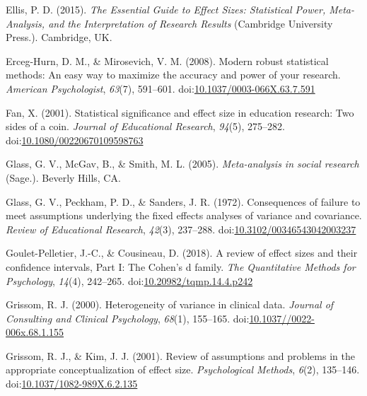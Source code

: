 \documentclass[
  man,floatsintext]{apa6}
\begin{document}
\leavevmode\hypertarget{ref-Ellis_2015}{}%
Ellis, P. D. (2015). \emph{The Essential Guide to Effect Sizes: Statistical Power, Meta-Analysis, and the Interpretation of Research Results} (Cambridge University Press.). Cambridge, UK.

\leavevmode\hypertarget{ref-Erceg-Hurn_Mirosevich_2008}{}%
Erceg-Hurn, D. M., \& Mirosevich, V. M. (2008). Modern robust statistical methods: An easy way to maximize the accuracy and power of your research. \emph{American Psychologist}, \emph{63}(7), 591--601. doi:\href{https://doi.org/10.1037/0003-066X.63.7.591}{10.1037/0003-066X.63.7.591}

\leavevmode\hypertarget{ref-Fan_2001}{}%
Fan, X. (2001). Statistical significance and effect size in education research: Two sides of a coin. \emph{Journal of Educational Research}, \emph{94}(5), 275--282. doi:\href{https://doi.org/10.1080/00220670109598763}{10.1080/00220670109598763}

\leavevmode\hypertarget{ref-Glass_et_al_1981}{}%
Glass, G. V., McGav, B., \& Smith, M. L. (2005). \emph{Meta-analysis in social research} (Sage.). Beverly Hills, CA.

\leavevmode\hypertarget{ref-Glass_et_al_1972}{}%
Glass, G. V., Peckham, P. D., \& Sanders, J. R. (1972). Consequences of failure to meet assumptions underlying the fixed effects analyses of variance and covariance. \emph{Review of Educational Research}, \emph{42}(3), 237--288. doi:\href{https://doi.org/10.3102/00346543042003237}{10.3102/00346543042003237}

\leavevmode\hypertarget{ref-Pelletier_Cousineau_2018}{}%
Goulet-Pelletier, J.-C., \& Cousineau, D. (2018). A review of effect sizes and their confidence intervals, Part I: The Cohen's d family. \emph{The Quantitative Methods for Psychology}, \emph{14}(4), 242--265. doi:\href{https://doi.org/10.20982/tqmp.14.4.p242}{10.20982/tqmp.14.4.p242}

\leavevmode\hypertarget{ref-Grissom_2000}{}%
Grissom, R. J. (2000). Heterogeneity of variance in clinical data. \emph{Journal of Consulting and Clinical Psychology}, \emph{68}(1), 155--165. doi:\href{https://doi.org/10.1037//0022-006x.68.1.155}{10.1037//0022-006x.68.1.155}

\leavevmode\hypertarget{ref-Grissom_Kim_2001}{}%
Grissom, R. J., \& Kim, J. J. (2001). Review of assumptions and problems in the appropriate conceptualization of effect size. \emph{Psychological Methods}, \emph{6}(2), 135--146. doi:\href{https://doi.org/10.1037/1082-989X.6.2.135}{10.1037/1082-989X.6.2.135}
\end{document}
